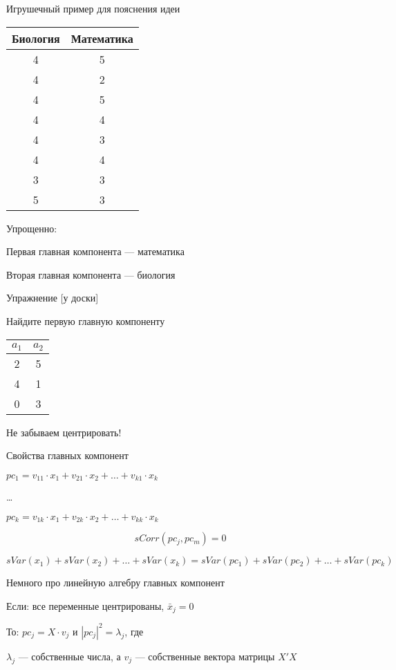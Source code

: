 \documentclass[ignorenonframetext,]{beamer}
\begin{document}
\begin{frame}{Игрушечный пример для пояснения идеи}

\begin{tabular}{cc}
Биология & Математика \\ 
\hline 
4 & 5 \\ 
4 & 2 \\ 
4 & 5 \\ 
4 & 4 \\ 
4 & 3 \\ 
4 & 4 \\ 
3 & 3 \\ 
5 & 3 \\ 
\end{tabular}

Упрощенно:

Первая главная компонента --- математика

Вторая главная компонента --- биология

\end{frame}

\begin{frame}{Упражнение {[}у доски{]}}

Найдите первую главную компоненту

\begin{tabular}{cc}
$a_1$ & $a_2$ \\ 
\hline 
2 & 5 \\ 
4 & 1 \\ 
0 & 3 \\ 
\end{tabular}

Не забываем центрировать!

\end{frame}

\begin{frame}{Свойства главных компонент}

\(pc_1=v_{11} \cdot x_1 + v_{21} \cdot x_2 + \ldots + v_{k1} \cdot x_k\)

\ldots{}

\(pc_k=v_{1k} \cdot x_1 + v_{2k} \cdot x_2 + \ldots + v_{kk} \cdot x_k\)

\[
sCorr(pc_j,pc_m)=0
\]

\[
sVar(x_1)+ sVar(x_2) + \ldots + sVar(x_k) =
sVar(pc_1)+ sVar(pc_2) + \ldots + sVar(pc_k)
\]

\end{frame}

\begin{frame}{Немного про линейную алгебру главных компонент}

Если: все переменные центрированы, \(\bar{x}_j=0\)

То: \(pc_j=X \cdot v_j\) и \(|pc_j|^2=\lambda_j\), где

\(\lambda_j\) --- собственные числа, а \(v_{j}\) --- собственные вектора
матрицы \(X'X\)

\end{frame}
\end{document}
